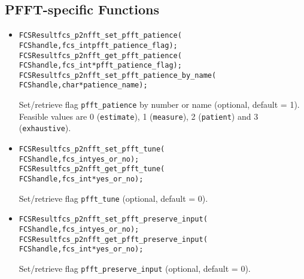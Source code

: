 \subsection{PFFT-specific Functions}
\begin{itemize}
  \item
\begin{alltt}
FCSResult fcs_p2nfft_set_pfft_patience(
    FCS handle, fcs_int pfft_patience_flag);
FCSResult fcs_p2nfft_get_pfft_patience(
    FCS handle, fcs_int* pfft_patience_flag);
FCSResult fcs_p2nfft_set_pfft_patience_by_name(
    FCS handle, char* patience_name );
\end{alltt}
    Set/retrieve flag \verb!pfft_patience! by number or name (optional, default = 1).
    Feasible values are 0 (\verb!estimate!), 1 (\verb!measure!), 2 (\verb!patient!) and 3 (\verb!exhaustive!).
  \item
\begin{alltt}
FCSResult fcs_p2nfft_set_pfft_tune(
    FCS handle, fcs_int yes_or_no);
FCSResult fcs_p2nfft_get_pfft_tune(
    FCS handle, fcs_int* yes_or_no);
\end{alltt}
    Set/retrieve flag \verb!pfft_tune! (optional, default = 0).
  \item
\begin{alltt}
FCSResult fcs_p2nfft_set_pfft_preserve_input(
    FCS handle, fcs_int yes_or_no);
FCSResult fcs_p2nfft_get_pfft_preserve_input(
    FCS handle, fcs_int* yes_or_no);
\end{alltt}
    Set/retrieve flag \verb!pfft_preserve_input! (optional, default = 0).
\end{itemize}






